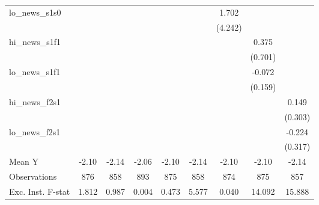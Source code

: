 {\begin{tabular}{l*{8}{c}}
\addlinespace
lo\_news\_s1s0&                     &                     &                     &                     &                     &       1.702         &                     &                     \\
            &                     &                     &                     &                     &                     &     (4.242)         &                     &                     \\
\addlinespace
hi\_news\_s1f1&                     &                     &                     &                     &                     &                     &       0.375         &                     \\
            &                     &                     &                     &                     &                     &                     &     (0.701)         &                     \\
\addlinespace
lo\_news\_s1f1&                     &                     &                     &                     &                     &                     &      -0.072         &                     \\
            &                     &                     &                     &                     &                     &                     &     (0.159)         &                     \\
\addlinespace
hi\_news\_f2s1&                     &                     &                     &                     &                     &                     &                     &       0.149         \\
            &                     &                     &                     &                     &                     &                     &                     &     (0.303)         \\
\addlinespace
lo\_news\_f2s1&                     &                     &                     &                     &                     &                     &                     &      -0.224         \\
            &                     &                     &                     &                     &                     &                     &                     &     (0.317)         \\
\midrule
Mean Y      &       -2.10         &       -2.14         &       -2.06         &       -2.10         &       -2.14         &       -2.10         &       -2.10         &       -2.14         \\
Observations&         876         &         858         &         893         &         875         &         858         &         874         &         875         &         857         \\
Exc. Inst. F-stat&       1.812         &       0.987         &       0.004         &       0.473         &       5.577         &       0.040         &      14.092         &      15.888         \\
\bottomrule
\end{tabular}
}
